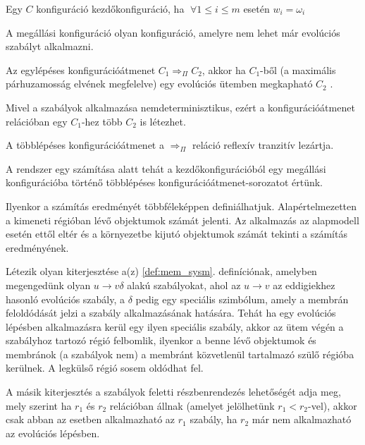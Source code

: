 \begin{note}
Egy $C$ konfiguráció kezdőkonfiguráció, ha $ \; \forall 1 \leq i \leq m$ esetén $w_i = \omega_i$
\end{note}

\begin{definition}
A megállási konfiguráció olyan konfiguráció, amelyre nem lehet már evolúciós szabályt alkalmazni.
\end{definition}

\begin{definition}
Az egylépéses konfigurációátmenet $C_1 \Longrightarrow_\Pi C_2$, akkor ha $C_1$-ből (a maximális párhuzamosság elvének megfelelve) egy evolúciós ütemben megkapható $C_2$ . 
\end{definition}

\begin{note}
Mivel a szabályok alkalmazása nemdeterminisztikus, ezért a konfigurációátmenet relációban egy $C_1$-hez több $C_2$ is létezhet.
\end{note}

\begin{definition}
A többlépéses konfigurációátmenet a $\Longrightarrow_\Pi$ reláció reflexív tranzitív lezártja. 
\end{definition}

A rendszer egy számítása alatt tehát a kezdőkonfigurációból egy megállási konfigurációba történő többlépéses konfigurációátmenet-sorozatot értünk.

\begin{note}
Ilyenkor a számítás eredményét többféleképpen definiálhatjuk. Alapértelmezetten a kimeneti régióban lévő objektumok számát jelenti. Az alkalmazás az alapmodell esetén ettől eltér és a környezetbe kijutó objektumok számát tekinti a számítás eredményének.
\end{note}

Létezik olyan kiterjesztése a(z) \ref{def:mem_sysm}. definíciónak, amelyben megengedünk olyan $u \rightarrow v \delta$ alakú szabályokat, ahol az $u \rightarrow v$ az eddigiekhez hasonló evolúciós szabály, a $\delta$ pedig egy speciális szimbólum, amely a membrán feloldódását jelzi a szabály alkalmazásának hatására. Tehát ha egy evolúciós lépésben alkalmazásra kerül egy ilyen speciális szabály, akkor az ütem végén a szabályhoz tartozó régió felbomlik, ilyenkor a benne lévő objektumok és membránok (a szabályok nem) a membránt közvetlenül tartalmazó szülő régióba kerülnek. A legkülső régió sosem oldódhat fel. 

A másik kiterjesztés a szabályok feletti részbenrendezés lehetőségét adja meg, mely szerint ha $r_1$ és $r_2$ relációban állnak (amelyet jelölhetünk $r_1 < r_2$-vel), akkor csak abban az esetben alkalmazható az $r_1$ szabály, ha $r_2$ már nem alkalmazható az evolúciós lépésben.

